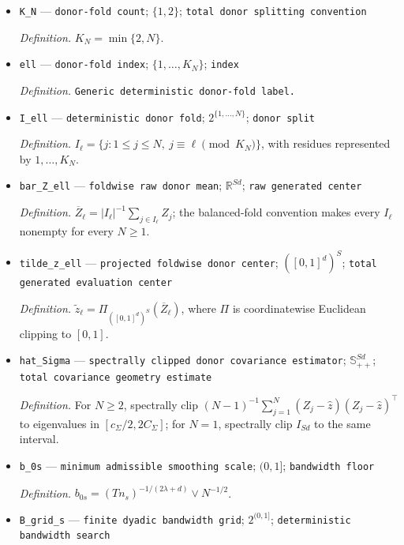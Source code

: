 \documentclass{article}
\begin{document}
\begin{itemize}
  \item \texttt{K\_\allowbreak{}N} --- \texttt{donor-\allowbreak{}fold count}; \(\{1,2\}\); \texttt{total donor splitting convention}
  \par\smallskip\noindent\emph{Definition.} \(K_N=\min\{2,N\}\).
  \item \texttt{ell} --- \texttt{donor-\allowbreak{}fold index}; \(\{1,\ldots,K_N\}\); \texttt{index}
  \par\smallskip\noindent\emph{Definition.} \texttt{Generic deterministic donor-\allowbreak{}fold label.}
  \item \texttt{I\_\allowbreak{}ell} --- \texttt{deterministic donor fold}; \(2^{\{1,\ldots,N\}}\); \texttt{donor split}
  \par\smallskip\noindent\emph{Definition.} \(I_\ell=\{j:1\le j\le N,\ j\equiv\ell\pmod {K_N}\}\), with residues represented by \(1,\ldots,K_N\).
  \item \texttt{bar\_\allowbreak{}Z\_\allowbreak{}ell} --- \texttt{foldwise raw donor mean}; \(\mathbb R^{Sd}\); \texttt{raw generated center}
  \par\smallskip\noindent\emph{Definition.} \(\overline Z_\ell=|I_\ell|^{-1}\sum_{j\in I_\ell}Z_j\); the balanced-fold convention makes every \(I_\ell\) nonempty for every \(N\ge1\).
  \item \texttt{tilde\_\allowbreak{}z\_\allowbreak{}ell} --- \texttt{projected foldwise donor center}; \(([0,1]^d)^S\); \texttt{total generated evaluation center}
  \par\smallskip\noindent\emph{Definition.} \(\widetilde z_\ell=\Pi_{([0,1]^d)^S}(\overline Z_\ell)\), where \(\Pi\) is coordinatewise Euclidean clipping to \([0,1]\).
  \item \texttt{hat\_\allowbreak{}Sigma} --- \texttt{spectrally clipped donor covariance estimator}; \(\mathbb S_{++}^{Sd}\); \texttt{total covariance geometry estimate}
  \par\smallskip\noindent\emph{Definition.} For \(N\ge2\), spectrally clip \((N-1)^{-1}\sum_{j=1}^{N}(Z_j-\widehat z)(Z_j-\widehat z)^{\top}\) to eigenvalues in \([c_\Sigma/2,2C_\Sigma]\); for \(N=1\), spectrally clip \(I_{Sd}\) to the same interval.
  \item \texttt{b\_\allowbreak{}0s} --- \texttt{minimum admissible smoothing scale}; \((0,1]\); \texttt{bandwidth floor}
  \par\smallskip\noindent\emph{Definition.} \(b_{0s}=(Tn_s)^{-1/(2\lambda+d)}\vee N^{-1/2}\).
  \item \texttt{B\_\allowbreak{}grid\_\allowbreak{}s} --- \texttt{finite dyadic bandwidth grid}; \(2^{(0,1]}\); \texttt{deterministic bandwidth search}

\end{itemize}
\end{document}

